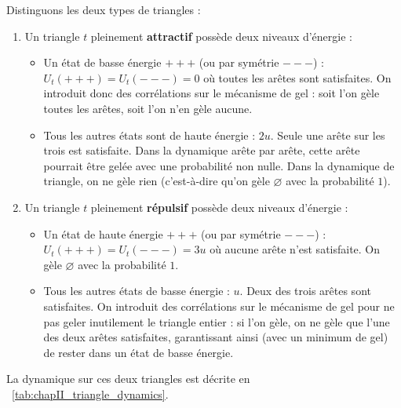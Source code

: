Distinguons les deux types de triangles :
\begin{enumerate}
    \item Un triangle $t$ pleinement \textbf{attractif} possède deux niveaux d'énergie :
    \begin{itemize}
        \item Un état de basse énergie $+++$ (ou par symétrie $---$) : $U_t(+++)=U_t(---) = 0$ où toutes les arêtes sont satisfaites. On introduit donc des corrélations sur le mécanisme de gel : soit l'on gèle toutes les arêtes, soit l'on n'en gèle aucune.
        \item Tous les autres états sont de haute énergie : $2u$. Seule une arête sur les trois est satisfaite. Dans la dynamique arête par arête, cette arête pourrait être gelée avec une probabilité non nulle. Dans la dynamique de triangle, on ne gèle rien (c'est-à-dire qu'on gèle $\varnothing$ avec la probabilité $1$).
    \end{itemize}
    \item Un triangle $t$ pleinement \textbf{répulsif} possède deux niveaux d'énergie :
    \begin{itemize}
        \item Un état de haute énergie $+++$ (ou par symétrie $---$) : $U_t(+++)=U_t(---) = 3u$ où aucune arête n'est satisfaite. On gèle $\varnothing$ avec la probabilité $1$.
        \item Tous les autres états de basse énergie : $u$. Deux des trois arêtes sont satisfaites. On introduit des corrélations sur le mécanisme de gel pour ne pas geler inutilement le triangle entier : si l'on gèle, on ne gèle que l'une des deux arêtes satisfaites, garantissant ainsi (avec un minimum de gel) de rester dans un état de basse énergie.
    \end{itemize}
\end{enumerate}

La dynamique sur ces deux triangles est décrite en \Tab~\ref{tab:chapII_triangle_dynamics}.


